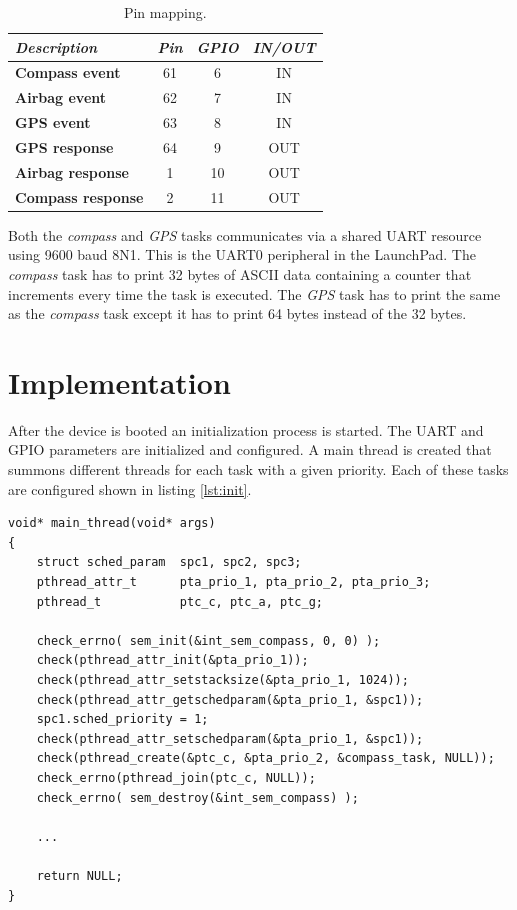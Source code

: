 \documentclass[10pt]{article}
\begin{document}
\begin{table}[H]
    \centering
    \begin{tabular}{|l|c|c|c|}
        \hline
        \textcolor{darkpink}{\textit{Description}}& \textcolor{darkpink}{\textit{Pin}} & \textcolor{darkpink}{\textit{GPIO}} &  \textcolor{darkpink}{\textit{IN/OUT}} \\
        \hline
        \textbf{Compass event} & 61 & 6 &  IN  \\
        \hline
        \textbf{Airbag event} & 62 &  7 &  IN  \\
        \hline
        \textbf{GPS event} & 63 & 8 &  IN  \\
        \hline
        \textbf{GPS response} & 64 & 9 &  OUT  \\
        \hline
        \textbf{Airbag response} & 1 & 10 &  OUT  \\
        \hline
        \textbf{Compass response} & 2 & 11 &  OUT  \\
        \hline
    \end{tabular}

    \caption{Pin mapping.}
    \label{tab:pins}
\end{table}

Both the \textit{compass} and \textit{GPS} tasks communicates via a shared UART resource using 9600 baud 8N1. This is the UART0 peripheral in the LaunchPad. The \textit{compass} task has to print 32 bytes of ASCII data containing a counter
that increments every time the task is executed. The \textit{GPS} task has to print the same as the \textit{compass} task except it has to print 64 bytes instead of the 32 bytes.\newpage
\section*{Implementation}

After the device is booted an initialization process is started. The UART and GPIO parameters are initialized and configured.
A main thread is created that summons different threads for each task with a given priority. Each of these
tasks are configured shown in listing \ref{lst:init}.

\begin{lstlisting}[style=CStyle, caption={Initialization}, captionpos=b, label={lst:init}, escapechar=@]
void* main_thread(void* args)
{
    struct sched_param  spc1, spc2, spc3;
    pthread_attr_t      pta_prio_1, pta_prio_2, pta_prio_3;
    pthread_t           ptc_c, ptc_a, ptc_g;

    check_errno( sem_init(&int_sem_compass, 0, 0) );
    check(pthread_attr_init(&pta_prio_1));
    check(pthread_attr_setstacksize(&pta_prio_1, 1024));
    check(pthread_attr_getschedparam(&pta_prio_1, &spc1));
    spc1.sched_priority = 1;
    check(pthread_attr_setschedparam(&pta_prio_1, &spc1));
    check(pthread_create(&ptc_c, &pta_prio_2, &compass_task, NULL));
    check_errno(pthread_join(ptc_c, NULL));
    check_errno( sem_destroy(&int_sem_compass) );
	
	...

    return NULL;
}

\end{lstlisting}
\end{document}
